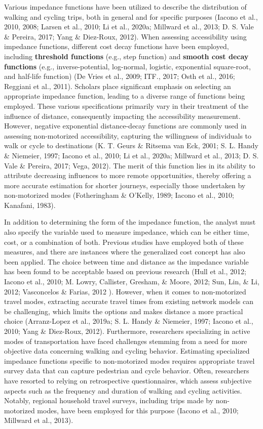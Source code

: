 \documentclass[
11pt, %
oneside, %
english, %
singlespacing, %
]{macthesis} %
\begin{document}
Various impedance functions have been utilized to describe the distribution of walking and cycling trips, both in general and for specific purposes (Iacono et al., 2010, 2008; Larsen et al., 2010; Li et al., 2020a; Millward et al., 2013; D. S. Vale \& Pereira, 2017; Yang \& Diez-Roux, 2012). When assessing accessibility using impedance functions, different cost decay functions have been employed, including \textbf{threshold functions} (e.g., step function) and \textbf{smooth cost decay functions} (e.g., inverse-potential, log-normal, logistic, exponential square-root, and half-life function) (De Vries et al., 2009; ITF., 2017; Osth et al., 2016; Reggiani et al., 2011). Scholars place significant emphasis on selecting an appropriate impedance function, leading to a diverse range of functions being employed. These various specifications primarily vary in their treatment of the influence of distance, consequently impacting the accessibility measurement. However, negative exponential distance-decay functions are commonly used in assessing non-motorized accessibility, capturing the willingness of individuals to walk or cycle to destinations (K. T. Geurs \& Ritsema van Eck, 2001; S. L. Handy \& Niemeier, 1997; Iacono et al., 2010; Li et al., 2020a; Millward et al., 2013; D. S. Vale \& Pereira, 2017; Vega, 2012). The merit of this function lies in its ability to attribute decreasing influences to more remote opportunities, thereby offering a more accurate estimation for shorter journeys, especially those undertaken by non-motorized modes (Fotheringham \& O'Kelly, 1989; Iacono et al., 2010; Kanafani, 1983).

In addition to determining the form of the impedance function, the analyst must also specify the variable used to measure impedance, which can be either time, cost, or a combination of both. Previous studies have employed both of these measures, and there are instances where the generalized cost concept has also been applied. The choice between time and distance as the impedance variable has been found to be acceptable based on previous research (Hull et al., 2012; Iacono et al., 2010; M. Lowry, Callister, Gresham, \& Moore, 2012; Sun, Lin, \& Li, 2012; Vasconcelos \& Farias, 2012 ). However, when it comes to non-motorized travel modes, extracting accurate travel times from existing network models can be challenging, which limits the options and makes distance a more practical choice (Arranz-Lopez et al., 2019a; S. L. Handy \& Niemeier, 1997; Iacono et al., 2010; Yang \& Diez-Roux, 2012). Furthermore, researchers specializing in active modes of transportation have faced challenges stemming from a need for more objective data concerning walking and cycling behavior. Estimating specialized impedance functions specific to non-motorized modes requires appropriate travel survey data that can capture pedestrian and cycle behavior. Often, researchers have resorted to relying on retrospective questionnaires, which assess subjective aspects such as the frequency and duration of walking and cycling activities. Notably, regional household travel surveys, including trips made by non-motorized modes, have been employed for this purpose (Iacono et al., 2010; Millward et al., 2013).
\end{document}

